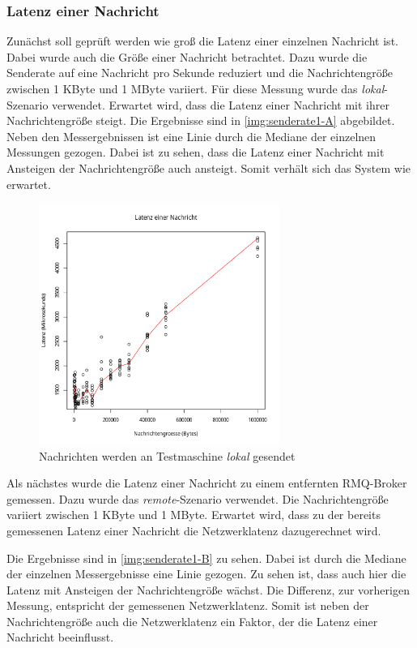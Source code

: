 \subsubsection{Latenz einer Nachricht}
\label{sec:oneMsgLatency}
Zunächst soll geprüft werden wie groß die Latenz einer einzelnen Nachricht ist. Dabei wurde auch die Größe einer Nachricht betrachtet. Dazu wurde die Senderate auf eine Nachricht pro Sekunde reduziert und die Nachrichtengröße zwischen 1 KByte und 1 MByte variiert. Für diese Messung wurde das \textit{lokal}-Szenario verwendet. Erwartet wird, dass die Latenz einer Nachricht mit ihrer Nachrichtengröße steigt.
Die Ergebnisse sind in \autoref{img:senderate1-A} abgebildet. Neben den Messergebnissen ist eine Linie durch die Mediane der einzelnen Messungen gezogen. Dabei ist zu sehen, dass die Latenz einer Nachricht mit Ansteigen der Nachrichtengröße auch ansteigt. Somit verhält sich das System wie erwartet.
\begin{figure}
\center
  \includegraphics[width=0.7\textwidth]{images/measurement/rate-limit-1-A.pdf}
  \caption{Nachrichten werden an Testmaschine \textit{lokal} gesendet}
  \label{img:senderate1-A}
\end{figure}

Als nächstes wurde die Latenz einer Nachricht zu einem entfernten RMQ-Broker gemessen. Dazu wurde das \textit{remote}-Szenario verwendet. Die Nachrichtengröße variiert zwischen 1 KByte und 1 MByte. Erwartet wird, dass zu der bereits gemessenen Latenz einer Nachricht die Netzwerklatenz dazugerechnet wird.

Die Ergebnisse sind in \autoref{img:senderate1-B} zu sehen. Dabei ist durch die Mediane der einzelnen Messergebnisse eine Linie gezogen. Zu sehen ist, dass auch hier die Latenz mit Ansteigen der Nachrichtengröße wächst. Die Differenz, zur vorherigen Messung, entspricht der gemessenen Netzwerklatenz.
Somit ist neben der Nachrichtengröße auch die Netzwerklatenz ein Faktor, der die Latenz einer Nachricht beeinflusst.

